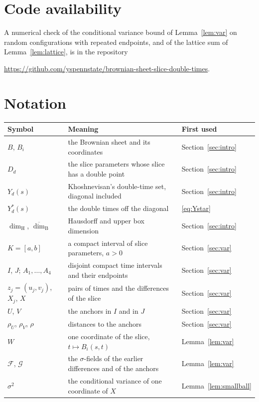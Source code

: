 \documentclass[11pt]{amsart}
\theoremstyle{remark}
\newcommand{\dimH}{\dim_{\mathrm H}}
\newcommand{\dimB}{\overline{\dim}_{\mathrm B}}
\begin{document}
\section*{Code availability}
A numerical check of the conditional variance bound of Lemma~\ref{lem:var} on random configurations with repeated
endpoints, and of the lattice sum of Lemma~\ref{lem:lattice}, is in the repository
\begin{center}\url{https://github.com/yspennstate/brownian-sheet-slice-double-times}.\end{center}

\appendix
\section{Notation}\label{app:notation}

\begin{center}
\small
\begin{tabular}{lll}
\toprule
Symbol & Meaning & First used\\
\midrule
$B$, $B_i$ & the Brownian sheet and its coordinates & Section~\ref{sec:intro}\\
$D_d$ & the slice parameters whose slice has a double point & Section~\ref{sec:intro}\\
$Y_d(s)$ & Khoshnevisan's double-time set, diagonal included & Section~\ref{sec:intro}\\
$Y^*_d(s)$ & the double times off the diagonal & \eqref{eq:Ystar}\\
$\dimH$, $\dimB$ & Hausdorff and upper box dimension & Section~\ref{sec:intro}\\
$K=[a,b]$ & a compact interval of slice parameters, $a>0$ & Section~\ref{sec:var}\\
$I$, $J$; $A_1,\dots,A_4$ & disjoint compact time intervals and their endpoints & Section~\ref{sec:var}\\
$z_j=(u_j,v_j)$, $X_j$, $X$ & pairs of times and the differences of the slice & Section~\ref{sec:var}\\
$U$, $V$ & the anchors in $I$ and in $J$ & Section~\ref{sec:var}\\
$\rho_U$, $\rho_V$, $\rho$ & distances to the anchors & Section~\ref{sec:var}\\
$W$ & one coordinate of the slice, $t\mapsto B_i(s,t)$ & Lemma~\ref{lem:var}\\
$\mathcal F$, $\mathcal G$ & the $\sigma$-fields of the earlier differences and of the anchors & Lemma~\ref{lem:var}\\
$\sigma^2$ & the conditional variance of one coordinate of $X$ & Lemma~\ref{lem:smallball}\\

\end{tabular}
\end{center}
\end{document}
